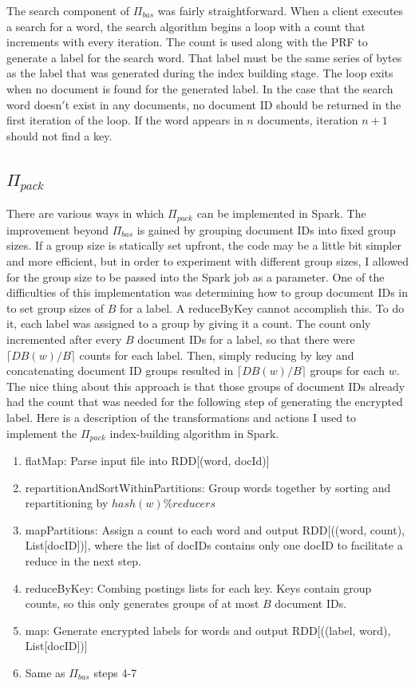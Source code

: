 \documentclass{sig-alternate-05-2015}
\begin{document}
The search component of $\Pi_{bas}$ was fairly straightforward. When a client executes a search for a word, the search algorithm begins a loop with a count that increments with every iteration. The count is used along with the PRF to generate a label for the search word. That label must be the same series of bytes as the label that was generated during the index building stage. The loop exits when no document is found for the generated label. In the case that the search word doesn$'$t exist in any documents, no document ID should be returned in the first iteration of the loop. If the word appears in $n$ documents, iteration $n+1$ should not find a key.

\subsection{$\Pi_{pack}$}
There are various ways in which $\Pi_{pack}$ can be implemented in Spark. The improvement beyond $\Pi_{bas}$ is gained by grouping document IDs into fixed group sizes. If a group size is statically set upfront, the code may be a little bit simpler and more efficient, but in order to experiment with different group sizes, I allowed for the group size to be passed into the Spark job as a parameter. One of the difficulties of this implementation was determining how to group document IDs in to set group sizes of $B$ for a label. A reduceByKey cannot accomplish this. To do it, each label was assigned to a group by giving it a count. The count only incremented after every $B$ document IDs for a label, so that there were $\lceil{DB(w)/B \rceil}$ counts for each label. Then, simply reducing by key and concatenating document ID groups resulted in $\lceil{DB(w)/B \rceil}$ groups for each $w$. The nice thing about this approach is that those groups of document IDs already had the count that was needed for the following step of generating the encrypted label. Here is a description of the transformations and actions I used to implement the $\Pi_{pack}$ index-building algorithm in Spark.

\begin{enumerate}
\item flatMap: Parse input file into RDD[(word, docId)]
\item repartitionAndSortWithinPartitions: Group words together by sorting and repartitioning by $hash(w)\%reducers$
\item mapPartitions: Assign a count to each word and output RDD[((word, count), List[docID])], where the list of docIDs contains only one docID to facilitate a reduce in the next step.
\item reduceByKey: Combing postings lists for each key. Keys contain group counts, so this only generates groups of at most $B$ document IDs.
\item map: Generate encrypted labels for words and output RDD[((label, word), List[docID])]
\item Same as $\Pi_{bas}$ steps 4-7
\end{enumerate}
\end{document}

